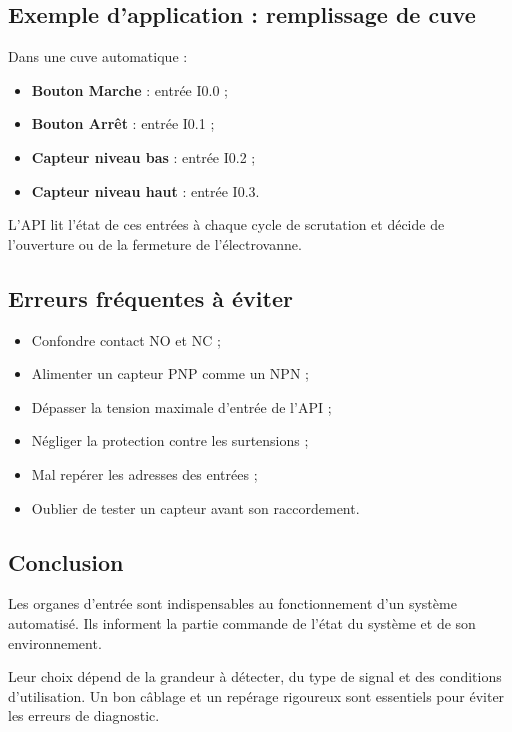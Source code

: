 \subsection{Exemple d'application : remplissage de cuve}

Dans une cuve automatique :

\begin{itemize}
    \item \textbf{Bouton Marche} : entrée I0.0 ;
    \item \textbf{Bouton Arrêt} : entrée I0.1 ;
    \item \textbf{Capteur niveau bas} : entrée I0.2 ;
    \item \textbf{Capteur niveau haut} : entrée I0.3.
\end{itemize}

L'API lit l'état de ces entrées à chaque cycle de scrutation et décide de l'ouverture ou de la fermeture de l'électrovanne.

\subsection{Erreurs fréquentes à éviter}

\begin{itemize}
    \item Confondre contact NO et NC ;
    \item Alimenter un capteur PNP comme un NPN ;
    \item Dépasser la tension maximale d'entrée de l'API ;
    \item Négliger la protection contre les surtensions ;
    \item Mal repérer les adresses des entrées ;
    \item Oublier de tester un capteur avant son raccordement.
\end{itemize}

\subsection{Conclusion}

Les organes d'entrée sont indispensables au fonctionnement d'un système automatisé. Ils informent la partie commande de l'état du système et de son environnement.

Leur choix dépend de la grandeur à détecter, du type de signal et des conditions d'utilisation. Un bon câblage et un repérage rigoureux sont essentiels pour éviter les erreurs de diagnostic.

